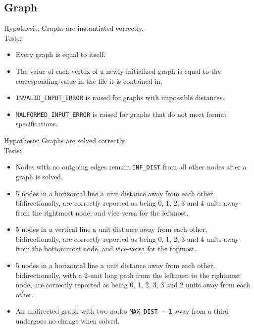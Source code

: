 \documentclass{article}
\begin{document}
\subsection{Graph}
Hypothesis: Graphs are instantiated correctly.\\
Tests:
\begin{itemize}
\item Every graph is equal to itself.
\item The value of each vertex of a newly-initialized graph is equal
  to the corresponding value in the file it is contained in.
\item \texttt{INVALID\_INPUT\_ERROR} is raised for graphs with
  impossible distances.
\item \texttt{MALFORMED\_INPUT\_ERROR} is raised for graphs that do
  not meet format specifications.\\
\end{itemize}
Hypothesis: Graphs are solved correctly.\\
Tests:
\begin{itemize}
\item Nodes with no outgoing edges remain \texttt{INF\_DIST} from all
  other nodes after a graph is solved.
\item 5 nodes in a horizontal line a unit distance away from each
  other, bidirectionally, are correctly reported as being 0, 1, 2, 3 and 4 units away
  from the rightmost node, and vice-versa for the leftmost.
\item 5 nodes in a vertical line a unit distance away from each
  other, bidirectionally, are correctly reported as being 0, 1, 2, 3 and 4 units away
  from the bottommost node, and vice-versa for the topmost.
\item 5 nodes in a horizontal line a unit distance away from each
  other, bidirectionally, with a 2-unit long path from the leftmost to the rightmost
  node, are correctly reported as being 0, 1, 2, 3, 3 and 2 units away
  from each other.
\item An undirected graph with two nodes \texttt{MAX\_DIST - 1} away from
  a third undergoes no change when solved.
\end{itemize}
\end{document}
